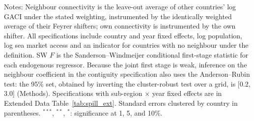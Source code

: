 \documentclass[12pt]{extarticle}
\begin{document}
\begin{table}[H]
{\begin{threeparttable}
\begin{tabular}{lccccc}
\bottomrule
\end{tabular}
\begin{tablenotes}[flushleft]
\footnotesize
\item Notes: Neighbour connectivity is the leave-out average of other countries' log GACI under the stated weighting, instrumented by the identically weighted average of their Feyrer shifters; own connectivity is instrumented by the own shifter. All specifications include country and year fixed effects, log population, log sea market access and an indicator for countries with no neighbour under the definition. SW $F$ is the Sanderson--Windmeijer conditional first-stage statistic for each endogenous regressor. Because the joint first stage is weak, inference on the neighbour coefficient in the contiguity specification also uses the Anderson--Rubin test: the 95\% set, obtained by inverting the cluster-robust test over a grid, is [0.2, 3.0] (Methods). Specifications with sub-region $\times$ year fixed effects are in Extended Data Table~\ref{tab:spill_ext}. Standard errors clustered by country in parentheses. $^{***}$, $^{**}$, $^{*}$: significance at 1, 5, and 10\%.
\end{tablenotes}
\end{threeparttable}}
\end{table}
\end{document}
